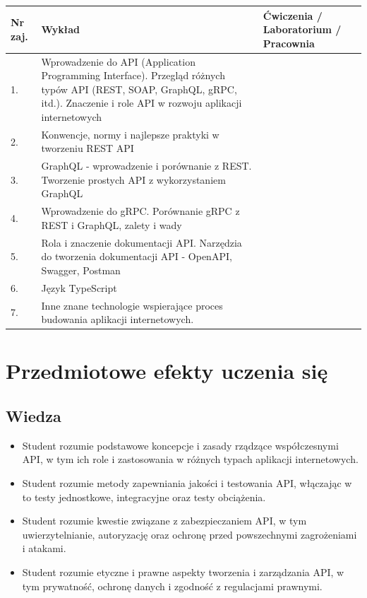 \documentclass[12pt, a4paper]{article}
\begin{document}
\begin{longtable}{|p{1.5cm}|p{6.5cm}|p{6.5cm}|}
\hline
\textbf{Nr zaj.} & \textbf{Wykład} & \textbf{Ćwiczenia / Laboratorium / Pracownia} \\\hline
\endhead
  \hline
  1. & Wprowadzenie do API (Application Programming Interface). Przegląd różnych typów API (REST, SOAP, GraphQL, gRPC, itd.). Znaczenie i role API w rozwoju aplikacji internetowych &  \\
  \hline
  2. & Konwencje, normy i najlepsze praktyki w tworzeniu REST API &  \\
  \hline
  3. & GraphQL - wprowadzenie i porównanie z REST. Tworzenie prostych API z wykorzystaniem GraphQL &  \\
  \hline
  4. & Wprowadzenie do gRPC. Porównanie gRPC z REST i GraphQL, zalety i wady &  \\
  \hline
  5. & Rola i znaczenie dokumentacji API. Narzędzia do tworzenia dokumentacji API - OpenAPI, Swagger, Postman &  \\
  \hline
  6. & Język TypeScript &  \\
  \hline
  7. & Inne znane technologie wspierające proces budowania aplikacji internetowych. &  \\
  \hline
\end{longtable}

\section{Przedmiotowe efekty uczenia się}

\subsection*{Wiedza}
\begin{itemize}
  \item Student rozumie podstawowe koncepcje i zasady rządzące współczesnymi API, w tym ich role i zastosowania w różnych typach aplikacji internetowych.
  \item Student rozumie metody zapewniania jakości i testowania API, włączając w to testy jednostkowe, integracyjne oraz testy obciążenia.
  \item Student rozumie kwestie związane z zabezpieczaniem API, w tym uwierzytelnianie, autoryzację oraz ochronę przed powszechnymi zagrożeniami i atakami.
  \item Student rozumie etyczne i prawne aspekty tworzenia i zarządzania API, w tym prywatność, ochronę danych i zgodność z regulacjami prawnymi.
\end{itemize}
\end{document}
